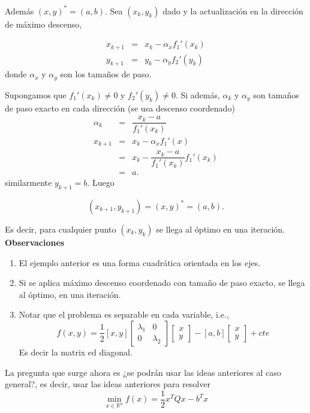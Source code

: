 \documentclass[11pt,letterpaper]{article}
\theoremstyle{definition}
\theoremstyle{definition}
\theoremstyle{definition}
\begin{document}
Además $ (x, y)^* = (a,b) $. Sea $ (x_k, y_k) $ dado y la actualización en la dirección de máximo descenso,
\begin{shaded*}
	\begin{eqnarray*}
		x_{k+1} & = & x_k - \alpha_x f_1'(x_k) \\
		y_{k+1} & = & y_k - \alpha_y f_2'(y_k)
	\end{eqnarray*}
	donde $ \alpha_x $ y $ \alpha_y $ son los tamaños de paso.
\end{shaded*}
Supongamos que $ f_1'(x_k) \neq 0 $ y $ f_2'(y_k) \neq 0 $. Si además, $ \alpha_k $ y $ \alpha_y $ son tamaños de paso exacto en cada dirección (se usa descenso coordenado) 
\begin{eqnarray*}
	\alpha_k & = & \dfrac{x_k -a}{f_1'(x_k)} \\
	x_{k+1}  & = & x_k - \alpha_x f_1'(x) \\
	         & = & x_k - \dfrac{x_k - a}{f_1'(x_k)} f_1'(x_k) \\
	         & = & a.
\end{eqnarray*}
similarmente $ y_{k+1} = b $. Luego 
\begin{shaded*}
	\begin{equation}
		(x_{k+1}, y_{k+1}) = (x,y)^* = (a, b).
	\end{equation}
\end{shaded*}
Es decir, para cualquier punto $ (x_k, y_k) $ se llega al óptimo en una iteración.
\\
\textbf{Observaciones}
\begin{enumerate}
	\item El ejemplo anterior es una forma cuadrática orientada en los ejes.
	\item Si se aplica máximo descenso coordenado con tamaño de paso exacto, se llega al óptimo, en una iteración.
	\item Notar que el problema es separable en cada variable, i.e.,
	\begin{equation}
		f(x, y) = \dfrac{1}{2} \left[ x, y \right] 
				  \left[ \begin{matrix}
				  			\lambda_1 & 0 \\
				  			0 & \lambda_2
				  \end{matrix} \right]
				  \left[ \begin{matrix}
				  	x \\
				  	y
				  \end{matrix} \right]
			  	  - \left[ a, b \right] 
			  	  \left[ \begin{matrix}
			  	  	x \\
			  	  	y
			  	  \end{matrix} \right] + cte
	\end{equation}
Es decir la matrix ed diagonal.
\end{enumerate}
La pregunta que surge ahora es ¿se podrán usar las ideas anteriores al caso general?, es decir, usar las ideas anteriores para resolver
\begin{equation}
	\min_{x\in\mathbb{R}^n} f(x) = \dfrac{1}{2} x^T Q x - b^T x
\end{equation}
\end{document}
